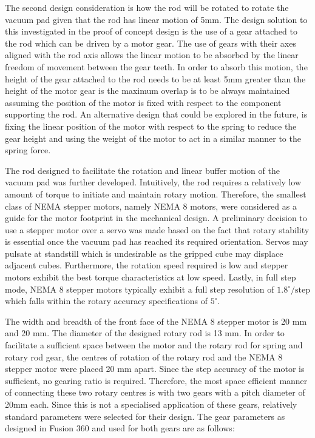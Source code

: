 The second design consideration is how the rod will be rotated to rotate the vacuum pad given that the rod has linear motion of 5mm. The design solution to this investigated in the proof of concept design is the use of a gear attached to the rod which can be driven by a motor gear. The use of gears with their axes aligned with the rod axis allows the linear motion to be absorbed by the linear freedom of movement between the gear teeth. In order to absorb this motion, the height of the gear attached to the rod needs to be at least 5mm greater than the height of the motor gear is the maximum overlap is to be always maintained assuming the position of the motor is fixed with respect to the component supporting the rod. An alternative design that could be explored in the future, is fixing the linear position of the motor with respect to the spring to reduce the gear height and using the weight of the motor to act in a similar manner to the spring force.


The rod designed to facilitate the rotation and linear buffer motion of the vacuum pad was further developed. Intuitively, the rod requires a relatively low amount of torque to initiate and maintain rotary motion. Therefore, the smallest class of NEMA stepper motors, namely NEMA 8 motors, were considered as a guide for the motor footprint in the mechanical design. A preliminary decision to use a stepper motor over a servo was made based on the fact that rotary stability is essential once the vacuum pad has reached its required orientation. Servos may pulsate at standstill which is undesirable as the gripped cube may displace adjacent cubes. Furthermore, the rotation speed required is low and stepper motors exhibit the best torque characteristics at low speed. Lastly, in full step mode, NEMA 8 stepper motors typically exhibit a full step resolution of $1.8 ^\circ / \text{step}$ which falls within the rotary accuracy specifications of $5 ^\circ$.


The width and breadth of the front face of the NEMA 8 stepper motor is 20 mm and 20 mm. The diameter of the designed rotary rod is 13 mm. In order to facilitate a sufficient space between the motor and the rotary rod for spring and rotary rod gear, the centres of rotation of the rotary rod and the NEMA 8 stepper motor were placed 20 mm apart. Since the step accuracy of the motor is sufficient, no gearing ratio is required. Therefore, the most space efficient manner of connecting these two rotary centres is with two gears with a pitch diameter of 20mm each. Since this is not a specialised application of these gears, relatively standard parameters were selected for their design. The gear parameters as designed in Fusion 360 and used for both gears are as follows:

